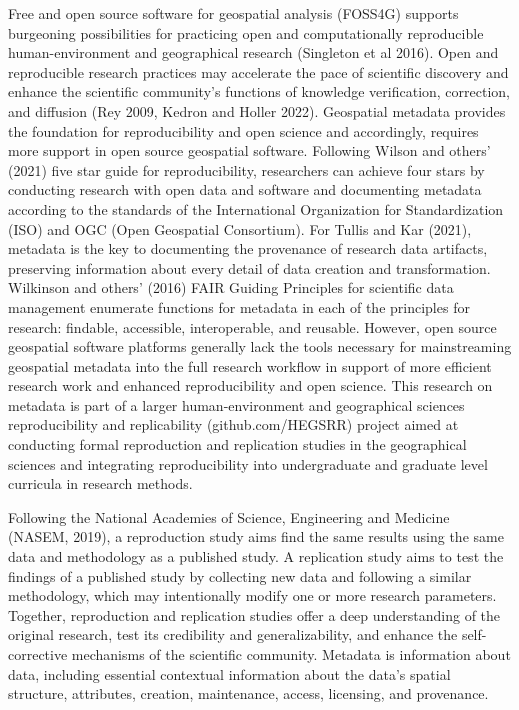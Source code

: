 \documentclass{isprs} %
\begin{document}
Free and open source software for geospatial analysis (FOSS4G) supports burgeoning possibilities for practicing open and computationally reproducible human-environment and geographical research (Singleton et al 2016).
Open and reproducible research practices may accelerate the pace of scientific discovery and enhance the scientific community's functions of knowledge verification, correction, and diffusion (Rey 2009, Kedron and Holler 2022).
Geospatial metadata provides the foundation for reproducibility and open science and accordingly, requires more support in open source geospatial software.
Following Wilson and others' (2021) five star guide for reproducibility, researchers can achieve four stars by conducting research with open data and software and documenting metadata according to the standards of the International Organization for Standardization (ISO) and OGC (Open Geospatial Consortium).
For Tullis and Kar (2021), metadata is the key to documenting the provenance of research data artifacts, preserving information about every detail of data creation and transformation.
Wilkinson and others' (2016) FAIR Guiding Principles for scientific data management enumerate functions for metadata in each of the principles for research: findable, accessible, interoperable, and reusable.
However, open source geospatial software platforms generally lack the tools necessary for mainstreaming geospatial metadata into the full research workflow in support of more efficient research work and enhanced reproducibility and open science.
This research on metadata is part of a larger human-environment and geographical sciences reproducibility and replicability (github.com/HEGSRR) project aimed at conducting formal reproduction and replication studies in the geographical sciences and integrating reproducibility into undergraduate and graduate level curricula in research methods.

Following the National Academies of Science, Engineering and Medicine (NASEM, 2019), a reproduction study aims find the same results using the same data and methodology as a published study.
A replication study aims to test the findings of a published study by collecting new data and following a similar methodology, which may intentionally modify one or more research parameters.
Together, reproduction and replication studies offer a deep understanding of the original research, test its credibility and generalizability, and enhance the self-corrective mechanisms of the scientific community.
Metadata is information about data, including essential contextual information about the data's spatial structure, attributes, creation, maintenance, access, licensing, and provenance.
\end{document}
